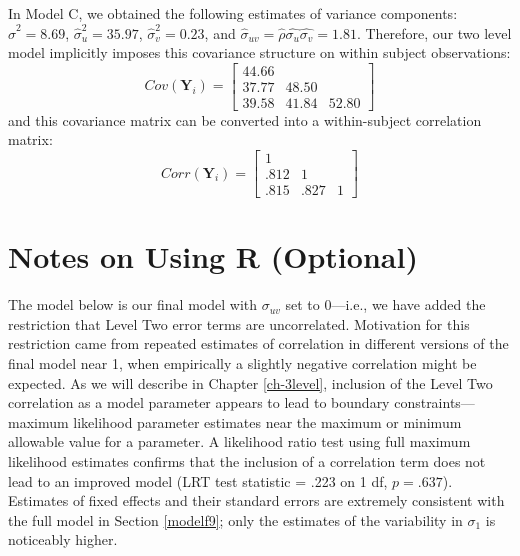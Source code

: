 \documentclass[
]{krantz}
\begin{document}
In Model C, we obtained the following estimates of variance components: \(\hat{\sigma}^{2}=8.69\), \(\hat{\sigma}^{2}_{u}=35.97\), \(\hat{\sigma}^{2}_{v}=0.23\), and \(\hat{\sigma}_{uv}=\hat{\rho}\hat{\sigma_{u}}\hat{\sigma_{v}}=1.81\). Therefore, our two level model implicitly imposes this covariance structure on within subject observations:
\[ Cov(\mathbf{Y}_i) =  \left[
          \begin{array}{cccc}
            44.66 & &   \\
            37.77 & 48.50 &  \\
            39.58 & 41.84 & 52.80
          \end{array} \right] \]
and this covariance matrix can be converted into a within-subject correlation matrix:
\[ Corr(\mathbf{Y}_i) =  \left[
          \begin{array}{cccc}
            1 & &   \\
            .812 & 1 &  \\
            .815 & .827 & 1
          \end{array} \right] \]

\hypertarget{notesr9}{%
\section{Notes on Using R (Optional)}\label{notesr9}}

The model below is our final model with \(\sigma_{uv}\) set to 0---i.e., we have added the restriction that Level Two error terms are uncorrelated. Motivation for this restriction came from repeated estimates of correlation in different versions of the final model near 1, when empirically a slightly negative correlation might be expected. As we will describe in Chapter \ref{ch-3level}, inclusion of the Level Two correlation as a model parameter appears to lead to boundary constraints---maximum likelihood parameter estimates near the maximum or minimum allowable value for a parameter. A likelihood ratio test using full maximum likelihood estimates confirms that the inclusion of a correlation term does not lead to an improved model (LRT test statistic = .223 on 1 df, \(p=.637\)). Estimates of fixed effects and their standard errors are extremely consistent with the full model in Section \ref{modelf9}; only the estimates of the variability in \(\sigma_{1}\) is noticeably higher.
\end{document}
